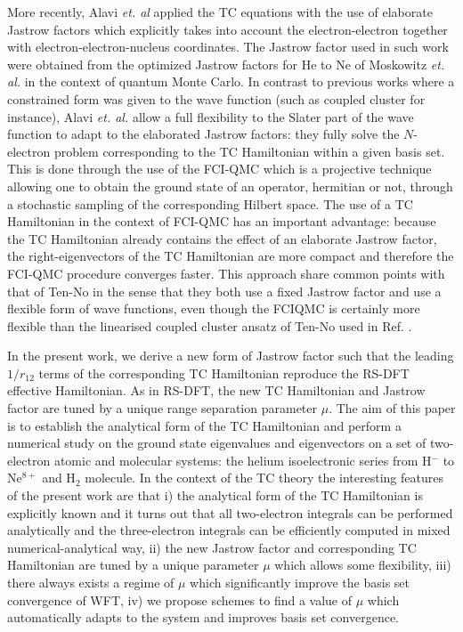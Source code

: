 \documentclass[aip,jcp,reprint,noshowkeys,superscriptaddress,twocolumn]{revtex4-1}
\begin{document}
More recently, Alavi \textit{et. al}\cite{CohLuoGutDobTewAla-JCP-19} applied the TC equations with the use of elaborate Jastrow factors which explicitly takes into account the electron-electron together with electron-electron-nucleus coordinates. The Jastrow factor used in such work were obtained from the optimized Jastrow factors for He to Ne of Moskowitz \textit{et. al.}\cite{SchMos-JCP-90} in the context of quantum Monte Carlo. 
In contrast to previous works where a constrained form was given to the wave function (such as coupled cluster for instance\cite{HinTanTen-CPL-02}),  Alavi \textit{et. al.} allow a full flexibility to the Slater part of the wave function to adapt to the elaborated Jastrow factors: they fully solve the $N$-electron problem corresponding to the TC Hamiltonian within a given basis set. 
This is done through the use of the FCI-QMC\cite{BooThoAla-JCP-09,BooAla-JCP-10,BooCleThoAla-JCP-11,GhaLozAla-JCP-19,VitAlaKat-JCTC-20} which is a projective technique allowing one to obtain the ground state of an operator, hermitian or not, through a stochastic sampling of the corresponding Hilbert space. The use of a TC Hamiltonian in the context of FCI-QMC has an important advantage: because the TC Hamiltonian already contains the effect of an elaborate Jastrow factor, the right-eigenvectors of the TC Hamiltonian are more compact and therefore the FCI-QMC procedure converges faster. 
This approach share common points with that of Ten-No in the sense that they both use a fixed Jastrow factor and use a flexible form of wave functions, 
even though the FCIQMC is certainly more flexible than the linearised coupled cluster ansatz of Ten-No used in Ref. . 

In the present work, we derive a new form of Jastrow factor such that the leading $1/r_{12}$ terms of the corresponding TC Hamiltonian reproduce the RS-DFT effective Hamiltonian. 
As in RS-DFT, the new TC Hamiltonian and Jastrow factor are tuned by a unique range separation parameter $\mu$. 
The aim of this paper is to establish the analytical form of the TC Hamiltonian and perform a numerical study on the ground state eigenvalues and eigenvectors on a set of two-electron atomic and molecular systems: the helium isoelectronic series from H$^-$ to Ne$^{8+}$ and H$_2$ molecule. 
In the context of the TC theory the interesting features of the present work are that 
i) the analytical form of the TC Hamiltonian is explicitly known and it turns out that all two-electron integrals can be performed analytically and the three-electron integrals can be efficiently computed in mixed numerical-analytical way, ii) the new Jastrow factor and corresponding TC Hamiltonian are tuned by a unique parameter $\mu$ which allows some flexibility, iii) there always exists a regime of $\mu$ which significantly improve the basis set convergence of WFT, iv) we propose schemes to find a value of $\mu$ which automatically adapts to the system and improves basis set convergence. 
\end{document}
